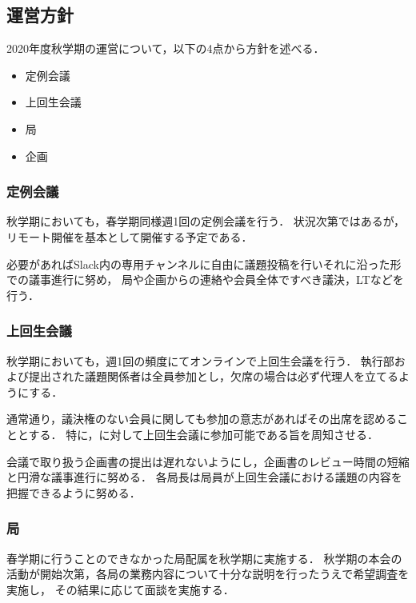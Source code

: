 \subsection*{運営方針}


2020年度秋学期の運営について，以下の4点から方針を述べる．
\begin{itemize}
    \item 定例会議
    \item 上回生会議
    \item 局
    \item 企画
\end{itemize}

\subsubsection*{定例会議}
秋学期においても，春学期同様週1回の定例会議を行う．
状況次第ではあるが，リモート開催を基本として開催する予定である．

必要があればSlack内の専用チャンネルに自由に議題投稿を行いそれに沿った形での議事進行に努め，
局や企画からの連絡や会員全体ですべき議決，LTなどを行う．


\subsubsection*{上回生会議}
秋学期においても，週1回の頻度にてオンラインで上回生会議を行う．
執行部および提出された議題関係者は全員参加とし，欠席の場合は必ず代理人を立てるようにする．

通常通り，議決権のない会員に関しても参加の意志があればその出席を認めることとする．
特に，\firstGrade{}に対して上回生会議に参加可能である旨を周知させる．

会議で取り扱う企画書の提出は遅れないようにし，企画書のレビュー時間の短縮と円滑な議事進行に努める．
各局長は局員が上回生会議における議題の内容を把握できるように努める．


\subsubsection*{局}
春学期に行うことのできなかった局配属を秋学期に実施する．
秋学期の本会の活動が開始次第，各局の業務内容について十分な説明を行ったうえで希望調査を実施し，
その結果に応じて面談を実施する．

